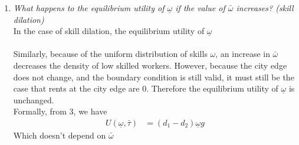 \documentclass[10pt, final]{article}
\begin{document}
\begin{enumerate}[1.]
  

    \bigskip
    \item \textit{What happens to the equilibrium utility of $\underline{\omega}$ if the value of $\bar{\omega}$ increases? (skill dilation)} \\
    In the case of skill dilation, the equilibrium utility of $\underline{\omega}$
    \\
    \\
    Similarly, because of the uniform distribution of skills $\omega$, an increase in $\bar{\omega}$ decreases the density of low skilled workers. However, because the city edge does not change, and the boundary condition is still valid, it must still be the case that rents at the city edge are $0$. Therefore the equilibrium utility of $\underline{\omega}$ is unchanged.
    \\
    Formally, from 3, we have
    \begin{align*}
        U(\underline{\omega}, \bar{\tau}) &= (d_1 - d_2) \underline{\omega} g
    \end{align*}
    Which doesn't depend on $\bar{\omega}$
\end{enumerate}
\end{document}
